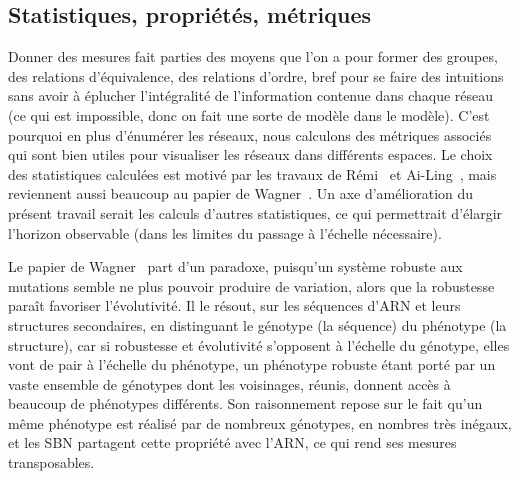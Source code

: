 \documentclass[12pt, a4paper]{article}
\begin{document}
\subsection{Statistiques, propriétés, métriques}
\label{sec:stats}

Donner des mesures fait parties des moyens que l'on a pour former des groupes, des relations d'équivalence, des relations d'ordre, bref pour se faire des intuitions sans avoir à éplucher l'intégralité de l'information contenue dans chaque réseau (ce qui est impossible, donc on fait une sorte de modèle dans le modèle). C'est pourquoi en plus d'énumérer les réseaux, nous calculons des métriques associés qui sont bien utiles pour visualiser les réseaux dans différents espaces. Le choix des statistiques calculées est motivé par les travaux de Rémi~\cite{segretain2023} et Ai-Ling~\cite{bonnet2023}, mais reviennent aussi beaucoup au papier de Wagner~\cite{wagner2008}. Un axe d'amélioration du présent travail serait les calculs d'autres statistiques, ce qui permettrait d'élargir l'horizon observable (dans les limites du passage à l'échelle nécessaire). 

Le papier de Wagner~\cite{wagner2008} part d'un paradoxe, puisqu'un système robuste aux mutations semble ne plus pouvoir produire de variation, alors que la robustesse paraît favoriser l'évolutivité.
Il le résout, sur les séquences d'ARN et leurs structures secondaires, en distinguant le génotype (la séquence) du phénotype (la structure), car si robustesse et évolutivité s'opposent à l'échelle du génotype, elles vont de pair à l'échelle du phénotype, un phénotype robuste étant porté par un vaste ensemble de génotypes dont les voisinages, réunis, donnent accès à beaucoup de phénotypes différents.
Son raisonnement repose sur le fait qu'un même phénotype est réalisé par de nombreux génotypes, en nombres très inégaux, et les SBN partagent cette propriété avec l'ARN, ce qui rend ses mesures transposables.
\end{document}
